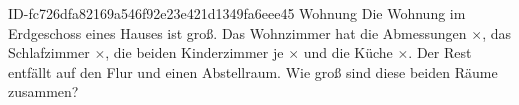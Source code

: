 \begin{exercise}
      {ID-fc726dfa82169a546f92e23e421d1349fa6eee45}
      {Wohnung}
  \ifproblem\problem
    Die Wohnung im Erdgeschoss eines Hauses ist  groß.
    Das Wohnzimmer hat die Abmessungen $\times$,
    das Schlafzimmer $\times$,
    die beiden Kinderzimmer je $\times$
    und die Küche $\times$.
    Der Rest entfällt auf den Flur und einen Abstellraum. Wie groß sind
    diese beiden Räume zusammen?
  \fi
\end{exercise}
